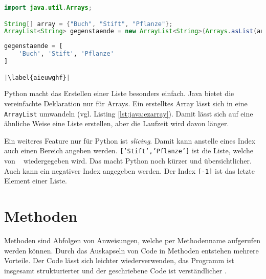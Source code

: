 \begin{minipage}{.5\linewidth}
\begin{lstlisting}[language=java,caption={Einfache Deklarierung Java},captionpos=b,label={lst:java:ezarray},frame=none]
import java.util.Arrays;

String[] array = {"Buch", "Stift", "Pflanze"};
ArrayList<String> gegenstaende = new ArrayList<String>(Arrays.asList(array));
\end{lstlisting}
\end{minipage}
\begin{minipage}{.5\linewidth}
\begin{lstlisting}[language=python,caption={Einfach Deklarierung Python},captionpos=b,label={lst:python:ezarray},frame=l,escapechar=|]
gegenstaende = [
    'Buch', 'Stift', 'Pflanze'
]

|\label{aieuwghf}|
\end{lstlisting}
\end{minipage}

Python macht das Erstellen einer Liste besonders einfach. Java bietet die vereinfachte Deklaration nur für Arrays. Ein erstelltes Array lässt sich in eine \texttt{ArrayList} umwandeln (vgl. Listing \ref{lst:java:ezarray}). Damit lässt sich auf eine ähnliche Weise eine Liste erstellen, aber die Laufzeit wird davon länger.

Ein weiteres Feature nur für Python ist \textit{slicing}. Damit kann anstelle eines Index auch einen Bereich angeben werden. \texttt{['Stift','Pflanze']} ist die Liste, welche von \  wiedergegeben wird. Das macht Python noch kürzer und übersichtlicher. Auch kann ein negativer Index angegeben werden. Der Index \texttt{[-1]} ist das letzte Element einer Liste.\par

\section{Methoden}
Methoden sind Abfolgen von Anweisungen, welche per Methodenname aufgerufen werden können. Durch das Auskapseln von Code in Methoden entstehen mehrere Vorteile. Der Code lässt sich leichter wiederverwenden, das Programm ist insgesamt strukturierter und der geschriebene Code ist verständlicher \cite{Louis:2010}\cite{Python3:Buch}. 

